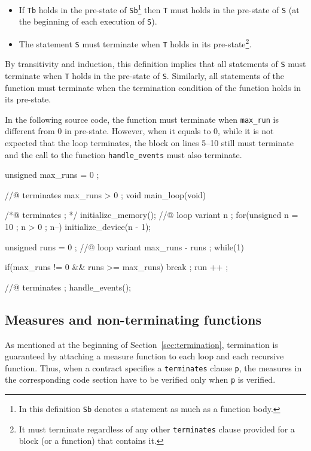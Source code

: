 \begin{itemize}
  \item If \lstinline|Tb| holds in the pre-state of \lstinline|Sb|\footnote{In
        this definition \lstinline|Sb| denotes a statement as much as a function
        body.} then \lstinline|T| must holds in the pre-state of \lstinline|S|
        (at the beginning of each execution of \lstinline|S|).
  \item The statement \lstinline|S| must terminate when \lstinline|T| holds in
        its pre-state\footnote{It must terminate regardless of any other
        \lstinline|terminates| clause provided for a block (or a function) that
        contains it.}.
\end{itemize}

By transitivity and induction, this definition implies that all statements of
\lstinline|S| must terminate when \lstinline|T| holds in the pre-state of
\lstinline|S|.
Similarly, all statements of the function must terminate when the termination
condition of the function holds in its pre-state.

\begin{example}
\label{ex:main_loop:terminates}
In the following source code, the function must terminate when
\lstinline|max_run| is different from 0 in pre-state. However, when it equals to
0, while it is not expected that the loop terminates, the block on lines 5--10
still must terminate and the call to the function \lstinline{handle_events}
must also terminate.
\begin{listing}{1}
unsigned max_runs = 0 ;

//@ terminates max_runs > 0 ;
void main_loop(void){
  /*@ terminates \true ; */ {
    initialize_memory();
    //@ loop variant n ;
    for(unsigned n = 10 ; n > 0 ; n--)
      initialize_device(n - 1);
  }

  unsigned runs = 0 ;
  //@ loop variant max_runs - runs ;
  while(1){
    if(max_runs != 0 && runs >= max_runs)
      break ;
    run ++ ;

    //@ terminates \true ;
    handle_events();
  }
}
\end{listing}
\end{example}

\subsection{Measures and non-terminating functions}

As mentioned at the beginning of Section~\ref{sec:termination}, termination is
guaranteed by attaching a measure function to each loop and each recursive
function. Thus, when a contract specifies a \lstinline+terminates+ clause
\lstinline{p}, the measures in the corresponding code section  have to be
verified only when \lstinline{p} is verified.


